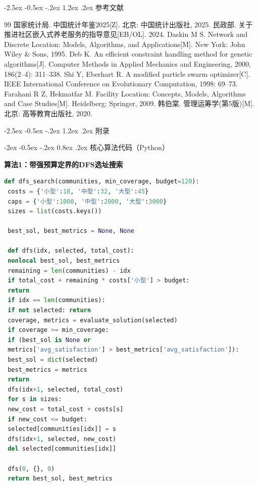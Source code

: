 \documentclass[zihao=-4]{cumcmthesis}
\makeatletter
\renewcommand\section{\@startsection{section}{1}{\z@}%
    {-2.5ex \@plus -0.5ex \@minus -.2ex}%
    {1.2ex \@plus .2ex}%
    {\centering\normalfont\large\bfseries}}
\renewcommand\subsection{\@startsection{subsection}{2}{\z@}%
    {-2ex \@plus -0.5ex \@minus -.2ex}%
    {0.8ex \@plus .2ex}%
    {\normalfont\normalsize\bfseries}}
\makeatother
\begin{document}
\section{参考文献}
\let\oldrefname\refname
\renewcommand{\refname}{}
\begin{thebibliography}{99}
 国家统计局. 中国统计年鉴2025[Z]. 北京: 中国统计出版社, 2025.
 民政部. 关于推进社区嵌入式养老服务的指导意见[EB/OL]. 2024.
 Daskin M S. Network and Discrete Location: Models, Algorithms, and Applications[M]. New York: John Wiley \& Sons, 1995.
 Deb K. An efficient constraint handling method for genetic algorithms[J]. Computer Methods in Applied Mechanics and Engineering, 2000, 186(2--4): 311--338.
 Shi Y, Eberhart R. A modified particle swarm optimizer[C]. IEEE International Conference on Evolutionary Computation, 1998: 69--73.
 Farahani R Z, Hekmatfar M. Facility Location: Concepts, Models, Algorithms and Case Studies[M]. Heidelberg: Springer, 2009.
 韩伯棠. 管理运筹学(第5版)[M]. 北京: 高等教育出版社, 2020.
\end{thebibliography}

\clearpage
\section{附录}

\subsection{核心算法代码（Python）}

\textbf{算法1：带强预算定界的DFS选址搜索}

\begin{lstlisting}[language=Python, caption={带强预算定界的DFS选址搜索}, label={code:dfs}]
def dfs_search(communities, min_coverage, budget=120):
 costs = {'小型':18, '中型':32, '大型':45}
 caps = {'小型':1000, '中型':2000, '大型':3000}
 sizes = list(costs.keys())

 best_sol, best_metrics = None, None

 def dfs(idx, selected, total_cost):
 nonlocal best_sol, best_metrics
 remaining = len(communities) - idx
 if total_cost + remaining * costs['小型'] > budget:
 return
 if idx == len(communities):
 if not selected: return
 coverage, metrics = evaluate_solution(selected)
 if coverage >= min_coverage:
 if (best_sol is None or
 metrics['avg_satisfaction'] > best_metrics['avg_satisfaction']):
 best_sol = dict(selected)
 best_metrics = metrics
 return
 dfs(idx+1, selected, total_cost)
 for s in sizes:
 new_cost = total_cost + costs[s]
 if new_cost <= budget:
 selected[communities[idx]] = s
 dfs(idx+1, selected, new_cost)
 del selected[communities[idx]]

 dfs(0, {}, 0)
 return best_sol, best_metrics
\end{lstlisting}
\end{document}
